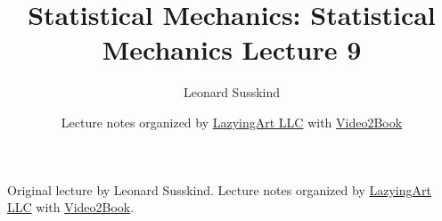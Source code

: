 \documentclass[11pt,oneside]{book}
\begin{document}
\frontmatter
\title{Statistical Mechanics: Statistical Mechanics Lecture 9}
\author{Leonard Susskind}
\date{Lecture notes organized by \href{https://lazying.art}{LazyingArt LLC} with \href{https://github.com/lachlanchen/Video2Book}{Video2Book}}
\maketitle
\begin{center}
\small Original lecture by Leonard Susskind. Lecture notes organized by \href{https://lazying.art}{LazyingArt LLC} with \href{https://github.com/lachlanchen/Video2Book}{Video2Book}.
\end{center}
\clearpage
\mainmatter

\end{document}
